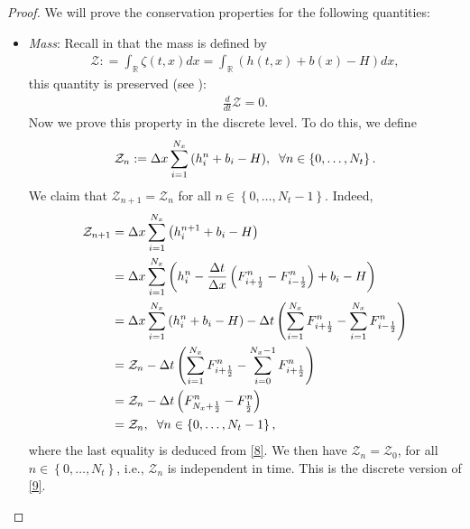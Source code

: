 \documentclass[11pt,a4paper,center,notitlepage]{article}
\numberwithin{equation}{section}
\begin{document}
\begin{proof}
We will prove the conservation properties for the following quantities:
\begin{itemize}
\item \textit{Mass}: 
Recall in \cite{Duchene2019} that the mass is defined by 
\begin{align*}
\mathcal{Z}: = \int_\mathbb{R} {\zeta \left( {t,x} \right)dx}  = \int_\mathbb{R} {\left( {h\left( {t,x} \right) + b\left( x \right) - H} \right)dx} ,
\end{align*}
this quantity is preserved (see \cite[Sec. 3.1, p. 21]{Duchene2019}): 
\begin{align}
\label{9}
\frac{d}{{dt}}  \mathcal{Z} = 0.
\end{align}
Now we prove this property in the discrete level. To do this, we define 
\begin{align*}
{\mathcal{Z}_n}: = \Delta x\sum\limits_{i = 1}^{{N_x}} {\left( {h_i^n + {b_i} - H} \right)} ,\hspace{2mm} \forall n \in \left\{ {0, \ldots ,{N_t}} \right\}.
\end{align*}
We claim that $\mathcal{Z}_{n+1} = \mathcal{Z}_n$ for all $n \in \left\{0,\ldots,N_t-1\right\}$. Indeed, 
\begin{align*}
{\mathcal{Z}_{n + 1}} &= \Delta x\sum\limits_{i = 1}^{{N_x}} {\left( {h_i^{n + 1} + {b_i} - H} \right)} \\
 &= \Delta x\sum\limits_{i = 1}^{{N_x}} {\left( {h_i^n - \frac{{\Delta t}}{{\Delta x}}\left( {F_{i + \frac{1}{2}}^n - F_{i - \frac{1}{2}}^n} \right) + {b_i} - H} \right)} \\
 &= \Delta x\sum\limits_{i = 1}^{{N_x}} {\left( {h_i^n + {b_i} - H} \right)}  - \Delta t\left( {\sum\limits_{i = 1}^{{N_x}} {F_{i + \frac{1}{2}}^n}  - \sum\limits_{i = 1}^{{N_x}} {F_{i - \frac{1}{2}}^n} } \right)\\
 &= {\mathcal{Z}_n} - \Delta t\left( {\sum\limits_{i = 1}^{{N_x}} {F_{i + \frac{1}{2}}^n}  - \sum\limits_{i = 0}^{{N_x} - 1} {F_{i + \frac{1}{2}}^n} } \right)\\
& = {\mathcal{Z}_n} - \Delta t\left( {F_{{N_x} + \frac{1}{2}}^n - F_{\frac{1}{2}}^n} \right)\\
&= {\mathcal{Z}_n}, \hspace{2mm} \forall n \in \left\{ {0, \ldots ,{N_t}-1} \right\},
\end{align*}
where the last equality is deduced from \eqref{8}. We then have $\mathcal{Z}_n = \mathcal{Z}_0$, for all $n \in \left\{ {0, \ldots ,{N_t}} \right\}$, i.e., $\mathcal{Z}_n$ is independent in time. This is the discrete version of \eqref{9}.


\end{itemize}
\end{proof}
\end{document}
